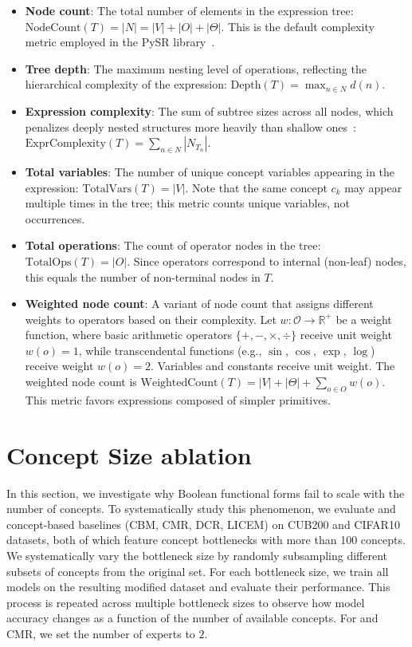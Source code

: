 \documentclass{article}
\theoremstyle{plain}
\theoremstyle{definition}
\theoremstyle{remark}
\begin{document}
\begin{itemize}
    \item \textbf{Node count}: The total number of elements in the expression tree: $\text{NodeCount}(T) = |N| = |V| + |O| + |\Theta|$. This is the default complexity metric employed in the PySR library~\citep{cranmer2023interpretable}.

    \item \textbf{Tree depth}: The maximum nesting level of operations, reflecting the hierarchical complexity of the expression: $\text{Depth}(T) = \max_{n \in N} d(n)$.

    \item \textbf{Expression complexity}: The sum of subtree sizes across all nodes, which penalizes deeply nested structures more heavily than shallow ones~\citep{keijzer2007crossover,smits2005pareto}: $\text{ExprComplexity}(T) = \sum_{n \in N} |N_{T_n}|$.

    \item \textbf{Total variables}: The number of unique concept variables appearing in the expression: $\text{TotalVars}(T) = |V|$. Note that the same concept $c_k$ may appear multiple times in the tree; this metric counts unique variables, not occurrences.

    \item \textbf{Total operations}: The count of operator nodes in the tree: $\text{TotalOps}(T) = |O|$. Since operators correspond to internal (non-leaf) nodes, this equals the number of non-terminal nodes in $T$.

    \item \textbf{Weighted node count}: A variant of node count that assigns different weights to operators based on their complexity. Let $w: \mathcal{O} \to \mathbb{R}^+$ be a weight function, where basic arithmetic operators $\{+, -, \times, \div\}$ receive unit weight $w(o) = 1$, while transcendental functions (e.g., $\sin$, $\cos$, $\exp$, $\log$) receive weight $w(o) = 2$. Variables and constants receive unit weight. The weighted node count is $\text{WeightedCount}(T) = |V| + |\Theta| + \sum_{o \in O} w(o)$. This metric favors expressions composed of simpler primitives.
\end{itemize}


\section{Concept Size ablation}
\label{app:concept_size_ablation}

In this section, we investigate why Boolean functional forms fail to scale with the number of concepts. To systematically study this phenomenon, we evaluate \linearacro{} and concept-based baselines (CBM, CMR, DCR, LICEM) on CUB200 and CIFAR10 datasets, both of which feature concept bottlenecks with more than 100 concepts. We systematically vary the bottleneck size by randomly subsampling different subsets of concepts from the original set. For each bottleneck size, we train all models on the resulting modified dataset and evaluate their performance. This process is repeated across multiple bottleneck sizes to observe how model accuracy changes as a function of the number of available concepts. For \linearacro{} and CMR, we set the number of experts to $2$. 
\end{document}
